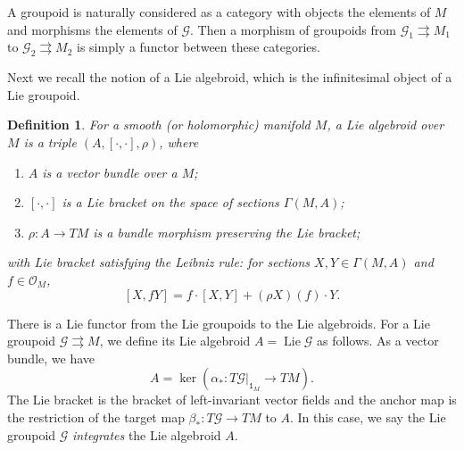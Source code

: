 \documentclass{amsart}
\newtheorem{definition}[theorem]{Definition}
\numberwithin{equation}{section}
\newcommand{\cG}{\mathcal{G}}
\newcommand{\cO}{\mathcal{O}}
\newcommand{\Lie}{\operatorname{Lie}}
\newcommand{\rra}{\rightrightarrows}
\begin{document}
A groupoid is naturally considered as a category with objects the elements of $M$ and morphisms the elements of $\cG$.
Then a morphism of groupoids from $\cG_1\rra M_1$ to $\cG_2\rra M_2$ is simply a functor between these categories.

Next we recall the notion of a Lie algebroid, which is the infinitesimal object of a Lie groupoid.
\begin{definition} \label{def:algeroid}
  For a smooth (or holomorphic) manifold $M$, a Lie algebroid over $M$ is a triple $(A, [\cdot, \cdot], \rho)$, where
  \begin{enumerate}
    \item $A$ is a vector bundle over a $M$;
    \item $[\cdot, \cdot]$ is a Lie bracket on the space of sections $\Gamma(M, A)$;
    \item $\rho: A \to TM$ is a bundle morphism preserving the Lie bracket;
  \end{enumerate}
  with Lie bracket satisfying the Leibniz rule: for sections $X, Y \in \Gamma(M, A)$ and $f \in \cO_M$,
  \[[X, fY] = f\cdot[X, Y] + (\rho X)(f) \cdot Y.\]
\end{definition}

There is a Lie functor from the Lie groupoids to the Lie algebroids.
For a Lie groupoid $\cG \rra M$, we define its Lie algebroid $A = \Lie \cG$ as follows.
As a vector bundle, we have
\begin{equation} \label{eq:Liefunctor}
	A = \ker \left(\alpha_*: T\cG|_{\mathtt{1}_M} \to TM \right).
\end{equation}
The Lie bracket is the bracket of left-invariant vector fields and the anchor map is the restriction of the target map $\beta_*: T\cG \to TM$ to $A$.
In this case, we say the Lie groupoid $\cG$ \emph{integrates} the Lie algebroid $A$.
\end{document}
